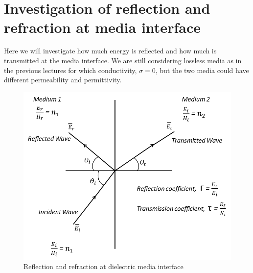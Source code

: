 \chapter{Investigation of reflection and refraction at media interface}\label{lec:lec31}
Here we will investigate how much energy is reflected and how much is transmitted at the media interface. We are still considering lossless media as in the previous lectures for which conductivity, $ \sigma = 0$, but the two media could have different permeability and permittivity.

\begin{figure}[h]
\centering
\includegraphics[width=1\linewidth]{./graphics/reflection_refraction1}
\caption{Reflection and refraction at dielectric media interface}
\label{fg:11}
\end{figure}

